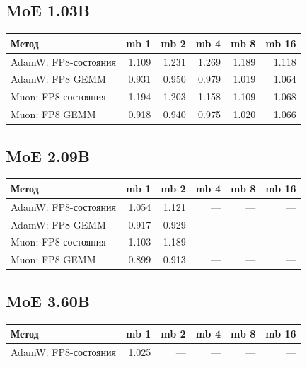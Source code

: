 \documentclass[10pt]{article}
\begin{document}
\subsection{MoE 1.03B}
\begin{center}
\small
\begin{tabular}{lrrrrr}
\toprule
\textbf{Метод} & \textbf{mb 1} & \textbf{mb 2} & \textbf{mb 4} & \textbf{mb 8} & \textbf{mb 16} \\
\midrule
AdamW: FP8-состояния & 1.109 & 1.231 & 1.269 & 1.189 & 1.118 \\
AdamW: FP8 GEMM & 0.931 & 0.950 & 0.979 & 1.019 & 1.064 \\
Muon: FP8-состояния & 1.194 & 1.203 & 1.158 & 1.109 & 1.068 \\
Muon: FP8 GEMM & 0.918 & 0.940 & 0.975 & 1.020 & 1.066 \\
\bottomrule
\end{tabular}
\end{center}
\subsection{MoE 2.09B}
\begin{center}
\small
\begin{tabular}{lrrrrr}
\toprule
\textbf{Метод} & \textbf{mb 1} & \textbf{mb 2} & \textbf{mb 4} & \textbf{mb 8} & \textbf{mb 16} \\
\midrule
AdamW: FP8-состояния & 1.054 & 1.121 & --- & --- & --- \\
AdamW: FP8 GEMM & 0.917 & 0.929 & --- & --- & --- \\
Muon: FP8-состояния & 1.103 & 1.189 & --- & --- & --- \\
Muon: FP8 GEMM & 0.899 & 0.913 & --- & --- & --- \\
\bottomrule
\end{tabular}
\end{center}
\subsection{MoE 3.60B}
\begin{center}
\small
\begin{tabular}{lrrrrr}
\toprule
\textbf{Метод} & \textbf{mb 1} & \textbf{mb 2} & \textbf{mb 4} & \textbf{mb 8} & \textbf{mb 16} \\
\midrule
AdamW: FP8-состояния & 1.025 & --- & --- & --- & --- \\
\bottomrule
\end{tabular}
\end{center}
\end{document}
